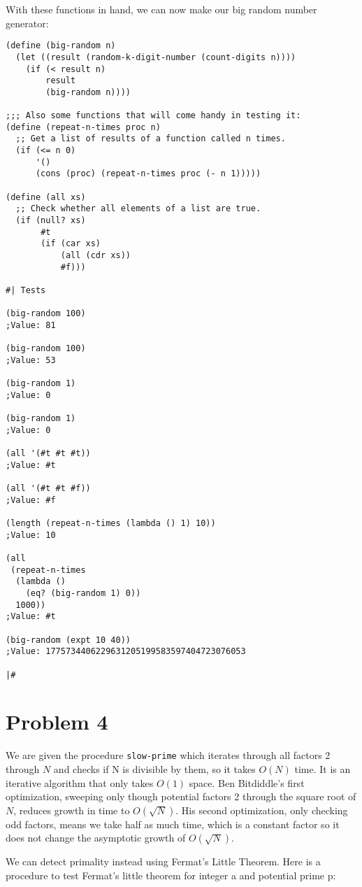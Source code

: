 \documentclass[12pt]{article}
\begin{document}
With these functions in hand, we can now make our big random number
generator:
\begin{verbatim}
(define (big-random n)
  (let ((result (random-k-digit-number (count-digits n))))
    (if (< result n)
        result
        (big-random n))))

;;; Also some functions that will come handy in testing it:
(define (repeat-n-times proc n)
  ;; Get a list of results of a function called n times.
  (if (<= n 0)
      '()
      (cons (proc) (repeat-n-times proc (- n 1)))))

(define (all xs)
  ;; Check whether all elements of a list are true.
  (if (null? xs)
       #t
       (if (car xs)
           (all (cdr xs))
           #f)))

#| Tests

(big-random 100)
;Value: 81

(big-random 100)
;Value: 53

(big-random 1)
;Value: 0

(big-random 1)
;Value: 0

(all '(#t #t #t))
;Value: #t

(all '(#t #t #f))
;Value: #f

(length (repeat-n-times (lambda () 1) 10))
;Value: 10

(all
 (repeat-n-times
  (lambda ()
    (eq? (big-random 1) 0))
  1000))
;Value: #t

(big-random (expt 10 40))
;Value: 1775734406229631205199583597404723076053

|#

\end{verbatim}

\section{Problem 4}

We are given the procedure \texttt{slow-prime} which iterates through
all factors 2 through $N$ and checks if N is divisible by them, so it
takes $O(N)$ time. It is an iterative algorithm that only takes $O(1)$
space. Ben Bitdiddle's first optimization, sweeping only though
potential factors 2 through the square root of $N$, reduces growth in
time to $O(\sqrt{N})$. His second optimization, only checking odd
factors, means we take half as much time, which is a constant factor
so it does not change the asymptotic growth of $O(\sqrt{N})$.

We can detect primality instead using Fermat's Little Theorem. Here is a
procedure to test Fermat's little theorem for integer a and
potential prime p:
\end{document}
